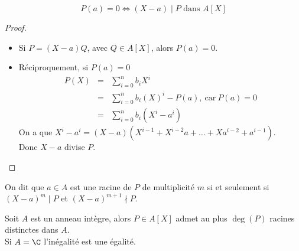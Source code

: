 \begin{prop}
	$$ P(a) = 0 \iff (X-a) \mid P \text{ dans } A[X]$$
\end{prop}

\begin{proof}
	\begin{itemize}
		\item Si $P = (X-a)Q$, avec $Q \in A[X]$, alors $P(a) = 0$.
		\item Réciproquement, si $P(a) = 0$
		      \begin{eqnarray*}
			      P(X) &=& \sum_{i=0}^n b_iX^i \\
			      &=& \sum_{i=0}^n b_i(X)^i  - P(a), \ \text{car}  \ P(a) = 0 \\
			      &=& \sum_{i=0}^n b_i(X^i-a^i)
		      \end{eqnarray*}
		      On a que $X^i - a^i = (X-a)(X^{i-1} + X^{i-2}a + \dots + Xa^{i-2} + a^{i-1})$. \\
		      Donc $X-a$ divise $P$.
	\end{itemize}
\end{proof}

\begin{definition}
	On dit que $a \in A$ est une racine de $P$ de multiplicité $m$ si et seulement si $(X-a)^m \mid P$ et $(X-a)^{m+1} \nmid P$.
\end{definition}

\begin{prop}
	Soit $A$ est un anneau intègre, alors $P \in A[X]$ admet au plus $\deg(P)$ racines distinctes dans $A$.\\
	Si $A = \C$ l'inégalité est une égalité.
\end{prop}

